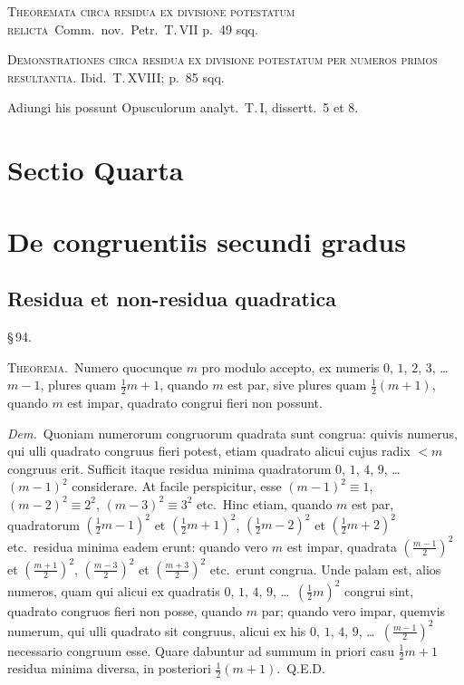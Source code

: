 \documentclass[12pt,a4paper]{article}
\theoremstyle{plain}
\theoremstyle{definition}
\theoremstyle{remark}
\begin{document}
\textsc{Theoremata circa residua ex divisione potestatum relicta}\ Comm.\ nov.\ Petr.\ T.\,VII p.~49 sqq.

\textsc{Demonstrationes circa residua ex divisione potestatum per numeros primos resultantia.} Ibid.\ T.\,XVIII; p.~85 sqq.

Adiungi his possunt Opusculorum analyt.\ T.\,I, dissertt.\ 5 et 8.

\section*{Sectio Quarta}
\section*{De congruentiis secundi gradus}

\subsection*{Residua et non-residua quadratica}

\begin{center}\S\,94.\end{center}

\textsc{Theorema.}\ Numero quocunque $m$ pro modulo accepto, ex numeris $0$, $1$, $2$, $3$, \dots\ $m-1$, plures quam $\frac{1}{2}m + 1$, quando $m$ est par, sive plures quam $\frac{1}{2}(m+1)$, quando $m$ est impar, quadrato congrui fieri non possunt.

\textit{Dem.}\ Quoniam numerorum congruorum quadrata sunt congrua: quivis numerus, qui ulli quadrato congruus fieri potest, etiam quadrato alicui cujus radix $< m$ congruus erit. Sufficit itaque residua minima quadratorum $0$, $1$, $4$, $9$, \dots\ $(m-1)^2$ considerare. At facile perspicitur, esse $(m-1)^2 \equiv 1$, $(m-2)^2 \equiv 2^2$, $(m-3)^2 \equiv 3^2$ etc.\ Hinc etiam, quando $m$ est par, quadratorum $(\frac{1}{2}m - 1)^2$ et $(\frac{1}{2}m + 1)^2$, $(\frac{1}{2}m - 2)^2$ et $(\frac{1}{2}m + 2)^2$ etc.\ residua minima eadem erunt: quando vero $m$ est impar, quadrata $(\frac{m-1}{2})^2$ et $(\frac{m+1}{2})^2$, $(\frac{m-3}{2})^2$ et $(\frac{m+3}{2})^2$ etc.\ erunt congrua. Unde palam est, alios numeros, quam qui alicui ex quadratis $0$, $1$, $4$, $9$, \dots\ $(\frac{1}{2}m)^2$ congrui sint, quadrato congruos fieri non posse, quando $m$ par; quando vero impar, quemvis numerum, qui ulli quadrato sit congruus, alicui ex his $0$, $1$, $4$, $9$, \dots\ $(\frac{m-1}{2})^2$ necessario congruum esse. Quare dabuntur ad summum in priori casu $\frac{1}{2}m + 1$ residua minima diversa, in posteriori $\frac{1}{2}(m+1)$.\ Q.E.D.
\end{document}
